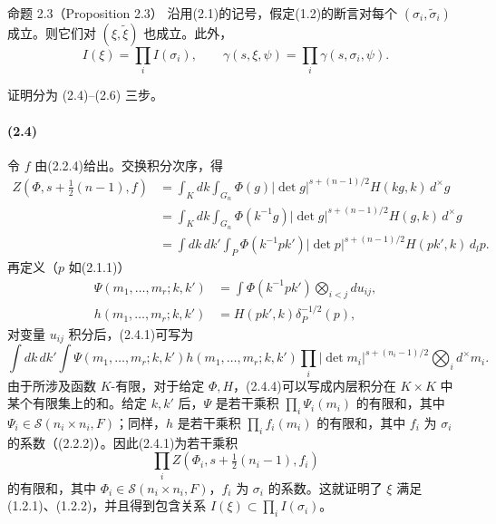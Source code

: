 \begin{originaltheorem}{命题 2.3（Proposition 2.3）}
沿用(2.1)的记号，假定(1.2)的断言对每个 $(\sigma_i,\widetilde\sigma_i)$ 成立。则它们对 $(\xi,\widetilde\xi)$ 也成立。此外，
\[
 I(\xi)=\prod_iI(\sigma_i),\qquad
 \gamma(s,\xi,\psi)=\prod_i\gamma(s,\sigma_i,\psi).
\]
\end{originaltheorem}
证明分为 (2.4)--(2.6) 三步。

\paragraph*{(2.4)} 令 $f$ 由(2.2.4)给出。交换积分次序，得
\begin{equation}
\begin{aligned}
 Z(\Phi,s+\tfrac12(n-1),f)
 &=\int_Kdk\int_{G_n}\Phi(g)|\det g|^{s+(n-1)/2}H(kg,k)\,d^\times g\\
 &=\int_Kdk\int_{G_n}\Phi(k^{-1}g)|\det g|^{s+(n-1)/2}H(g,k)\,d^\times g\\
 &=\int dk\,dk'\int_P\Phi(k^{-1}pk')|\det p|^{s+(n-1)/2}H(pk',k)\,d_lp.
\end{aligned}\tag{2.4.1}
\end{equation}
再定义（$p$ 如(2.1.1)）
\begin{align}
 \Psi(m_1,\ldots,m_r;k,k')&=\int\Phi(k^{-1}pk')\bigotimes_{i<j}du_{ij},\tag{2.4.2}\\
 h(m_1,\ldots,m_r;k,k')&=H(pk',k)\delta_P^{-1/2}(p),\tag{2.4.3}
\end{align}
对变量 $u_{ij}$ 积分后，(2.4.1)可写为
\begin{equation}
 \int dk\,dk'\int\Psi(m_1,\ldots,m_r;k,k')h(m_1,\ldots,m_r;k,k')
 \prod_i|\det m_i|^{s+(n_i-1)/2}\bigotimes_i d^\times m_i.\tag{2.4.4}
\end{equation}
由于所涉及函数 $K$-有限，对于给定 $\Phi,H$，(2.4.4)可以写成内层积分在 $K\times K$ 中某个有限集上的和。给定 $k,k'$ 后，$\Psi$ 是若干乘积 $\prod_i\Psi_i(m_i)$ 的有限和，其中 $\Psi_i\in\mathcal S(n_i\times n_i,F)$；同样，$h$ 是若干乘积 $\prod_if_i(m_i)$ 的有限和，其中 $f_i$ 为 $\sigma_i$ 的系数（(2.2.2)）。因此(2.4.1)为若干乘积
\begin{equation}
 \prod_i Z(\Phi_i,s+\tfrac12(n_i-1),f_i)\tag{2.4.5}
\end{equation}
的有限和，其中 $\Phi_i\in\mathcal S(n_i\times n_i,F)$，$f_i$ 为 $\sigma_i$ 的系数。这就证明了 $\xi$ 满足 (1.2.1)、(1.2.2)，并且得到包含关系 $I(\xi)\subset\prod_iI(\sigma_i)$。

